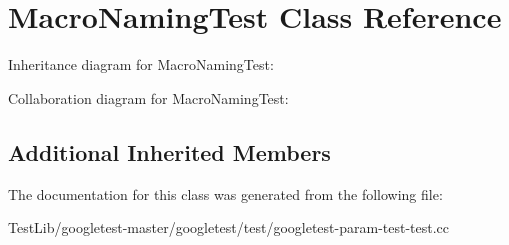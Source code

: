 \hypertarget{classMacroNamingTest}{}\section{Macro\+Naming\+Test Class Reference}
\label{classMacroNamingTest}


Inheritance diagram for Macro\+Naming\+Test\+:


Collaboration diagram for Macro\+Naming\+Test\+:
\subsection*{Additional Inherited Members}


The documentation for this class was generated from the following file\+:\begin{DoxyCompactItemize}
\item 
Test\+Lib/googletest-\/master/googletest/test/googletest-\/param-\/test-\/test.\+cc\end{DoxyCompactItemize}
